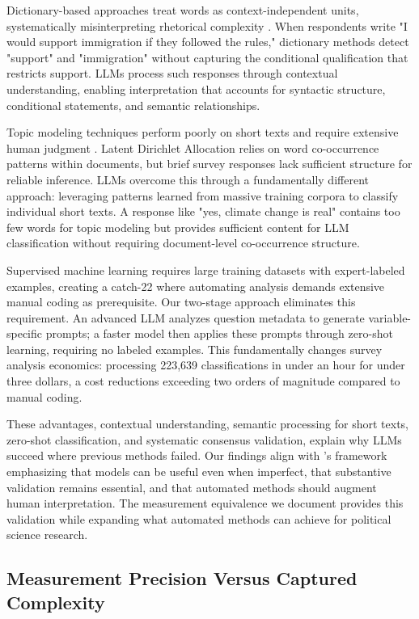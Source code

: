 \documentclass[
  journal=ram,
  manuscript=article-type,
  year=2025,
  volume=unpublished,
]{cup-journal}
\begin{document}
Dictionary-based approaches treat words as context-independent units, systematically misinterpreting rhetorical complexity \citep{tausczik_pennebaker10}. When respondents write "I would support immigration if they followed the rules," dictionary methods detect "support" and "immigration" without capturing the conditional qualification that restricts support. LLMs process such responses through contextual understanding, enabling interpretation that accounts for syntactic structure, conditional statements, and semantic relationships. 

Topic modeling techniques perform poorly on short texts and require extensive human judgment \citep{pietsch_lessmann18}. Latent Dirichlet Allocation relies on word co-occurrence patterns within documents, but brief survey responses lack sufficient structure for reliable inference. LLMs overcome this through a fundamentally different approach: leveraging patterns learned from massive training corpora to classify individual short texts. A response like "yes, climate change is real" contains too few words for topic modeling but provides sufficient content for LLM classification without requiring document-level co-occurrence structure.

Supervised machine learning requires large training datasets with expert-labeled examples, creating a catch-22 where automating analysis demands extensive manual coding as prerequisite. Our two-stage approach eliminates this requirement. An advanced LLM analyzes question metadata to generate variable-specific prompts; a faster model then applies these prompts through zero-shot learning, requiring no labeled examples. This fundamentally changes survey analysis economics: processing 223,639 classifications in under an hour for under three dollars, a cost reductions exceeding two orders of magnitude compared to manual coding.

These advantages, contextual understanding, semantic processing for short texts, zero-shot classification, and systematic consensus validation, explain why LLMs succeed where previous methods failed. Our findings align with \citet{grimmer_stewart13}'s framework emphasizing that models can be useful even when imperfect, that substantive validation remains essential, and that automated methods should augment human interpretation. The measurement equivalence we document provides this validation while expanding what automated methods can achieve for political science research.

\subsection{Measurement Precision Versus Captured Complexity}
\end{document}
